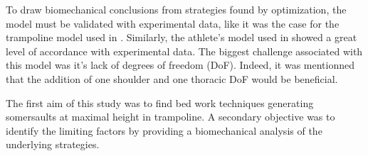 To draw biomechanical conclusions from strategies found by optimization, the model must be validated with experimental data, like it was the case for the trampoline model used in \cite{jacques2008determining}.
Similarly, the athlete's model used in \cite{burke2015mechanics} showed a great level of accordance with experimental data.
The biggest challenge associated with this model was it's lack of degrees of freedom (DoF).
Indeed, it was mentionned  that the addition of one shoulder and one thoracic DoF would be beneficial.


The first aim of this study was to find bed work techniques  generating somersaults at maximal height in trampoline. 
A secondary objective was to identify the limiting factors by providing a biomechanical analysis of the underlying strategies.



